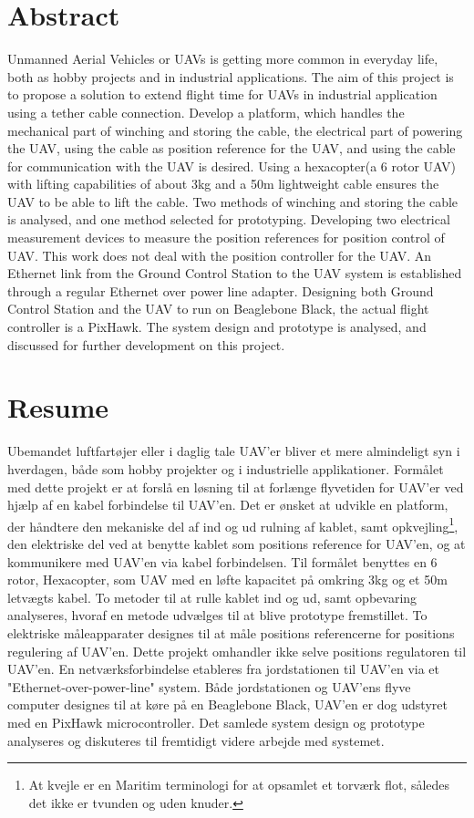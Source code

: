 \chapter{Abstract}
Unmanned Aerial Vehicles or UAVs is getting more common in everyday life, both as hobby projects and in industrial applications. The aim of this project is to propose a solution to extend flight time for UAVs in industrial application using a tether cable connection. Develop a platform, which handles the mechanical part of winching and storing the cable, the electrical part of powering the UAV, using the cable as position reference for the UAV, and using the cable for communication with the UAV is desired.
Using a hexacopter(a 6 rotor UAV) with lifting capabilities of about 3kg and a 50m lightweight cable ensures the UAV to be able to lift the cable.
Two methods of winching and storing the cable is analysed, and one method selected for prototyping.
Developing two electrical measurement devices to measure the position references for position control of UAV. This work does not deal with the position controller for the UAV.
An Ethernet link from the Ground Control Station to the UAV system is established through a regular Ethernet over power line adapter.
Designing both Ground Control Station and the UAV to run on Beaglebone Black, the actual flight controller is a PixHawk.
The system design and prototype is analysed, and discussed for further development on this project.


\chapter{Resume}
Ubemandet luftfartøjer eller i daglig tale UAV'er bliver et mere almindeligt syn i hverdagen, både som hobby projekter og i industrielle applikationer. Formålet med dette projekt er at forslå en løsning til at forlænge flyvetiden for UAV'er ved hjælp af en kabel forbindelse til UAV'en. Det er ønsket at udvikle en platform, der håndtere den mekaniske del af ind og ud rulning af kablet, samt opkvejling\footnote{At kvejle er en Maritim terminologi for at opsamlet et torværk flot, således det ikke er tvunden og uden knuder.}, den elektriske del ved at benytte kablet som positions reference for UAV'en, og at kommunikere med UAV'en via kabel forbindelsen.
Til formålet benyttes en 6 rotor, Hexacopter, som UAV med en løfte kapacitet på omkring 3kg og et 50m letvægts kabel.
To metoder til at rulle kablet ind og ud, samt opbevaring analyseres, hvoraf en metode udvælges til at blive prototype fremstillet.
To elektriske måleapparater designes til at måle positions referencerne for positions regulering af UAV'en. Dette projekt omhandler ikke selve positions regulatoren til UAV'en. En netværksforbindelse etableres fra jordstationen til UAV'en via et "Ethernet-over-power-line" system. Både jordstationen og UAV'ens flyve computer designes til at køre på en Beaglebone Black, UAV'en er dog udstyret med en PixHawk microcontroller.
Det samlede system design og prototype analyseres og diskuteres til fremtidigt videre arbejde med systemet.  